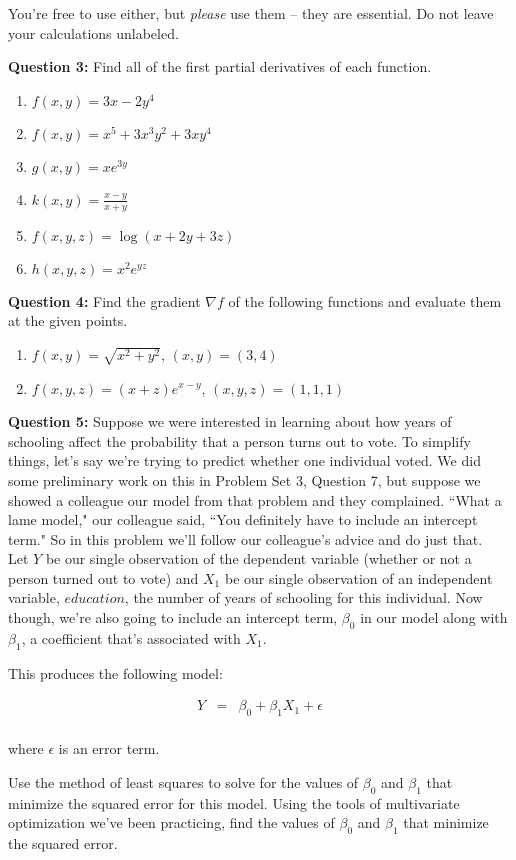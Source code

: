 \documentclass[10pt]{amsart}
\begin{document}
You're free to use either, but {\it please} use them -- they are essential. Do not leave your calculations unlabeled.

\textbf{Question 3:} Find all of the first partial derivatives of each function.

\begin{enumerate}
\item $f(x,y) = 3x - 2y^4$

\item $f(x,y) = x^5 + 3x^3y^2 + 3xy^4$

\item $g(x,y) = xe^{3y}$

\item $k(x,y) = \frac{x-y}{x+y}$

\item $f(x,y,z) = \log(x+2y+3z)$

\item $h(x,y,z) = x^2 e^{yz}$
\end{enumerate}


\medskip

\textbf{Question 4:} Find the gradient $\nabla f$ of the following functions and evaluate them at the given points.
\begin{enumerate}
\item $f(x,y) = \sqrt{x^2 + y^2}$, \quad $(x,y) = (3,4)$
\item $f(x,y,z) = (x+z)e^{x-y}$, \quad $(x,y,z) = (1,1,1)$
\end{enumerate}


\medskip


\textbf{Question 5:} Suppose we were interested in learning about how years of schooling affect the probability that a person turns out to vote. To simplify things, let's say we're trying to predict whether one individual voted. We did some preliminary work on this in Problem Set 3, Question 7, but suppose we showed a colleague our model from that problem and they complained. ``What a lame model," our colleague said, ``You definitely have to include an intercept term." So in this problem we'll follow our colleague's advice and do just that.\\

Let $Y$ be our single observation of the dependent variable (whether or not a person turned out to vote) and $X_1$ be our single observation of an independent variable, $education$, the number of years of schooling for this individual. Now though, we're also going to include an intercept term, $\beta_0$ in our model along with $\beta_1$, a coefficient that's associated with $X_1$. 

This produces the following model: 

\bigskip
\begin{eqnarray*}
Y&=& \beta_0 + \beta_1 X_1 + \epsilon\\
 \end{eqnarray*}
 
 where $\epsilon$ is an error term.
 
 Use the method of least squares to solve for the values of $\beta_0$ and $\beta_1$ that minimize the squared error for this model. Using the tools of multivariate optimization we've been practicing, find the values of $\beta_0$ and $\beta_1$ that minimize the squared error.
\end{document}
